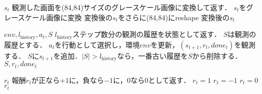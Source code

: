 \documentclass{jarticle}
\begin{document}
\begin{algorithm}[tb]
\caption{$observe_{\mathrm{gray84}}()$}
\label{alg:process_frame84}                          
\begin{algorithmic}[1]   
\REQUIRE $s_t$
\STATE 観測した画面を(84,84)サイズのグレースケール画像に変換して返す．
\STATE $s_t$をグレースケール画像に変換
\STATE 変換後の$s_t$をさらに(84,84)にreshape
\ENSURE 変換後の$s_t$
\end{algorithmic}
\end{algorithm}

\begin{algorithm}[tb]
\caption{$step_{\mathrm{stack}}(a_t)$}
\label{alg:frame_stack}                          
\begin{algorithmic}[1]   
\REQUIRE $env, l_{\mathrm{history}}, a_t, S$
\STATE $l_{\mathrm{history}}$ステップ数分の観測の履歴を状態として返す．
\STATE $S$は観測の履歴とする．
\STATE $a_t$を行動として選択し，環境$env$を更新，$(s_{t+1},r_t, done_t)$を観測する．
\STATE $S$に$s_{t+1}$を追加．$|S|>l_{\mathrm{history}}$なら，一番古い履歴を$S$から削除する．
\ENSURE $S, r_t, done_t$
\end{algorithmic}
\end{algorithm}

\begin{algorithm}[tb]
\caption{$reward_{\mathrm{clip}}()$}
\label{alg:clipped_reward_wrapper}                          
\begin{algorithmic}[1]   
\REQUIRE $r_t$
\STATE 報酬$r_t$が正なら$+1$に，負なら$-1$に，$0$なら$0$として返す．
\STATE $r_t=1$
\STATE $r_t=-1$
\ELSE
\STATE $r_t=0$
\ENDIF
\ENSURE $r_t$
\end{algorithmic}
\end{algorithm}
\end{document}
